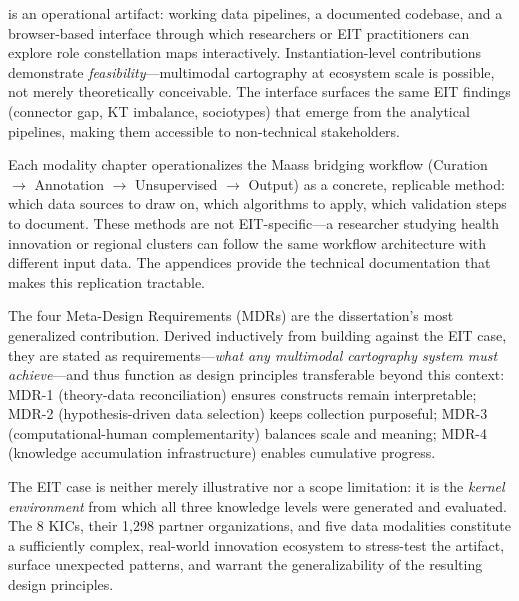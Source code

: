 \documentclass[../main.tex]{subfiles}
\begin{document}
\begin{description}[leftmargin=0.5cm, itemsep=0.4em]

\item[Instantiation] \RoleBox{} is an operational artifact: working data pipelines, a documented codebase, and a browser-based interface through which researchers or EIT practitioners can explore role constellation maps interactively. Instantiation-level contributions demonstrate \emph{feasibility}---multimodal cartography at ecosystem scale is possible, not merely theoretically conceivable. The interface surfaces the same EIT findings (connector gap, KT imbalance, sociotypes) that emerge from the analytical pipelines, making them accessible to non-technical stakeholders.

\item[Methods] Each modality chapter operationalizes the Maass bridging workflow (Curation $\rightarrow$ Annotation $\rightarrow$ Unsupervised $\rightarrow$ Output) as a concrete, replicable method: which data sources to draw on, which algorithms to apply, which validation steps to document. These methods are not EIT-specific---a researcher studying health innovation or regional clusters can follow the same workflow architecture with different input data. The appendices provide the technical documentation that makes this replication tractable.

\item[Design Principles] The four Meta-Design Requirements (MDRs) are the dissertation's most generalized contribution. Derived inductively from building \RoleBox{} against the EIT case, they are stated as requirements---\emph{what any multimodal cartography system must achieve}---and thus function as design principles transferable beyond this context: MDR-1 (theory-data reconciliation) ensures constructs remain interpretable; MDR-2 (hypothesis-driven data selection) keeps collection purposeful; MDR-3 (computational-human complementarity) balances scale and meaning; MDR-4 (knowledge accumulation infrastructure) enables cumulative progress.

\end{description}

The EIT case is neither merely illustrative nor a scope limitation: it is the \emph{kernel environment} \parencite{hevner2004design} from which all three knowledge levels were generated and evaluated. The 8 KICs, their 1,298 partner organizations, and five data modalities constitute a sufficiently complex, real-world innovation ecosystem to stress-test the artifact, surface unexpected patterns, and warrant the generalizability of the resulting design principles.
\end{document}

